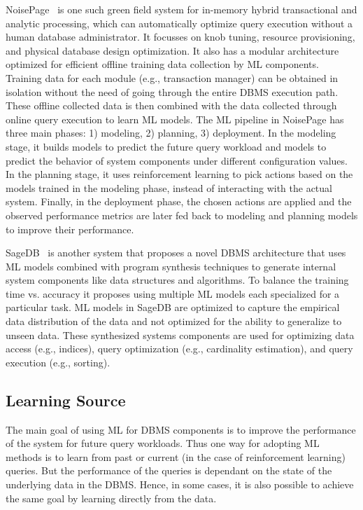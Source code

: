 NoisePage~\cite{noisepage} is one such green field system for in-memory hybrid transactional and analytic processing, which can automatically optimize query execution without a human database administrator.
It focusses on knob tuning, resource provisioning, and physical database design optimization.
It also has a modular architecture optimized for efficient offline training data collection by ML components.
Training data for each module (e.g., transaction manager) can be obtained in isolation without the need of going through the entire DBMS execution path.
These offline collected data is then combined with the data collected through online query execution to learn ML models.
The ML pipeline in NoisePage has three main phases: 1) modeling, 2) planning, 3) deployment.
In the modeling stage, it builds models to predict the future query workload and models to predict the behavior of system components under different configuration values.
In the planning stage, it uses reinforcement learning to pick actions based on the models trained in the modeling phase, instead of interacting with the actual system.
Finally, in the deployment phase, the chosen actions are applied and the observed performance metrics are later fed back to modeling and planning models to improve their performance.

SageDB~\cite{sagedb} is another system that proposes a novel DBMS architecture that uses ML models combined with program synthesis techniques to generate internal system components like data structures and algorithms.
To balance the training time vs. accuracy it proposes using multiple ML models each specialized for a particular task.
ML models in SageDB are optimized to capture the empirical data distribution of the data and not optimized for the ability to generalize to unseen data.
These synthesized systems components are used for optimizing data access (e.g., indices), query optimization (e.g., cardinality estimation), and query execution (e.g., sorting).


\subsection{Learning Source} 
The main goal of using ML for DBMS components is to improve the performance of the system for future query workloads.
Thus one way for adopting ML methods is to learn from past or current (in the case of reinforcement learning) queries.
But the performance of the queries is dependant on the state of the underlying data in the DBMS.
Hence, in some cases, it is also possible to achieve the same goal by learning directly from the data.

